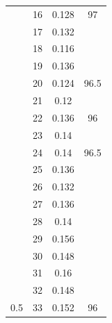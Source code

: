 \documentclass{article}
\begin{document}
\begin{multicols}{2}
\begin{table}[H]
\begin{tabular}{|c|c|c|c|}
 & 16 & 0.128 & \multirow{-2}{*}{\cellcolor[HTML]{FFFFC7}97} \\ \cline{2-4} 
 & 17 & 0.132 &  \\ \cline{2-3}
 & 18 & 0.116 &  \\ \cline{2-3}
 & 19 & 0.136 &  \\ \cline{2-3}
 & 20 & 0.124 & \multirow{-4}{*}{96.5} \\ \cline{2-4} 
 & 21 & 0.12 &  \\ \cline{2-3}
 & 22 & 0.136 & \multirow{-2}{*}{96} \\ \cline{2-4} 
 & 23 & 0.14 &  \\ \cline{2-3}
 & 24 & 0.14 & \multirow{-2}{*}{96.5} \\ \cline{2-4} 
 & 25 & 0.136 &  \\ \cline{2-3}
 & 26 & 0.132 &  \\ \cline{2-3}
 & 27 & 0.136 &  \\ \cline{2-3}
 & 28 & 0.14 &  \\ \cline{2-3}
 & 29 & 0.156 &  \\ \cline{2-3}
 & 30 & 0.148 &  \\ \cline{2-3}
 & 31 & 0.16 &  \\ \cline{2-3}
 & 32 & 0.148 &  \\ \cline{2-3}
\multirow{-34}{*}{0.5} & 33 & 0.152 & \multirow{-9}{*}{96} \\ \hline
\end{tabular}
\end{table}



\end{multicols}
\end{document}
